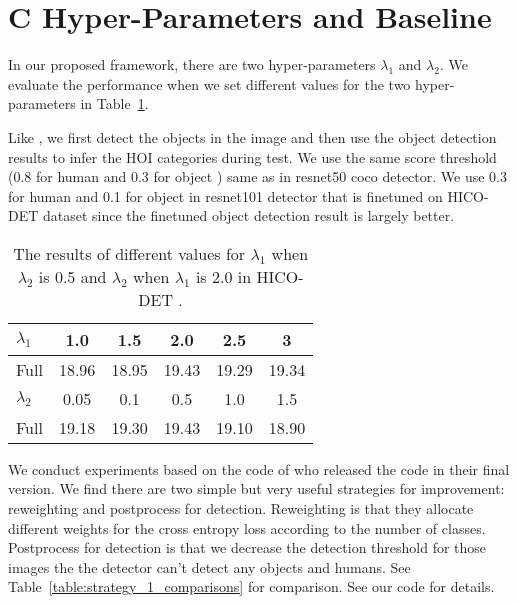 \documentclass[runningheads]{llncs}
\begin{document}
\section*{C Hyper-Parameters and Baseline}
\label{sec:hyper-param}

In our proposed framework, there are two hyper-parameters $\lambda_1$ and $\lambda_2$.
We evaluate the performance when we set different values for the two hyper-parameters in Table~\ref{table:lambda_1_comparisons}.

Like \cite{gao2018ican, li2018transferable}, we first detect the objects in the image and then use the object detection results to infer the HOI categories during test. We use the same score threshold (0.8 for human and 0.3 for object ) same as \cite{li2018transferable} in resnet50 coco detector. We use 0.3 for human and 0.1 for object in resnet101 detector that is finetuned on HICO-DET dataset since the finetuned object detection result is largely better.


\begin{table}
\begin{center}
\caption{The results of different values for $\lambda_1$ when $\lambda_2$ is 0.5 and $\lambda_2$ when $\lambda_1$ is 2.0 in HICO-DET .
}
\label{table:lambda_1_comparisons}
\small
\begin{tabular}{lccccc}
\hline
$\lambda_1$ & 1.0 & 1.5 & 2.0 & 2.5 & 3 \\
\hline\hline
Full & 18.96 & 18.95 & 19.43 & 19.29 & 19.34 \\
\hline\hline
$\lambda_2$  & 0.05 & 0.1 & 0.5 & 1.0 & 1.5 \\
\hline
Full & 19.18 & 19.30 & 19.43 & 19.10 & 18.90 \\
\hline
\end{tabular}
\end{center}
\end{table}


We conduct experiments based on the code of \cite{li2018transferable} who released the code in their final version. We find there are two simple but very useful strategies for improvement: reweighting and postprocess for detection. Reweighting is that they allocate different weights for the cross entropy loss according to the number of classes. Postprocess for detection is that we decrease the detection threshold for those images the the detector can't detect any objects and humans. See Table~\ref{table:strategy_1_comparisons} for comparison. See our code for details.
\end{document}
